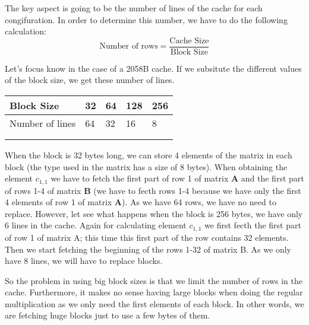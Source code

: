 \documentclass{article}
\begin{document}
The key aspect is going to be the number of lines of the cache for each congifuration. In order to determine this number, we have to do the following calculation: 
\[
\text{Number of rows} = \frac{\text{Cache Size}}{\text{Block Size}}
\]

Let's focus know in the case of a 2058B cache. If we subsitute the different values of the block size, we get these number of lines.

{
\begin{table}[h]
    \centering
    \begin{tabular}{lllll}
    \hline
    \multicolumn{1}{|l|}{Block Size}      & \multicolumn{1}{l|}{32} & \multicolumn{1}{l|}{64} & \multicolumn{1}{l|}{128} & \multicolumn{1}{l|}{256} \\ \hline
    \multicolumn{1}{|l|}{Number of lines} & \multicolumn{1}{l|}{64} & \multicolumn{1}{l|}{32} & \multicolumn{1}{l|}{16}  & \multicolumn{1}{l|}{8}   \\ \hline
                                          &                         &                         &                          &                          \\
                                          &                         &                         &                          &                         
    \end{tabular}
\end{table}
}



When the block is 32 bytes long, we can store 4 elements of the matrix in each block (the type used in the matrix has a size of 8 bytes). When obtaining the element $c_{1,1}$ we have to fetch the first part of row 1 of matrix $\mathbf{A}$ and the first part of rows 1-4 of matrix $\mathbf{B}$ (we have to fecth rows 1-4 because we have only the first 4 elements of row 1 of matrix $\mathbf{A}$). As we have 64 rows, we have no need to replace. However, let see what happens when the block is 256 bytes, we have only 6 lines in the cache. Again for calculating element $c_{1,1}$ we first fecth the first part of row 1 of matrix A; this time this first part of the row contains 32 elements. Then we start fetching the beginning of the rows 1-32 of matrix B. As we only have 8 lines, we will have to replace blocks. 

So the problem in using big block sizes is that we limit the number of rows in the cache. Furthermore, it makes no sense having large blocks when doing the regular multiplication as we only need the first elements of each block. In other words, we are fetching huge blocks just to use a few bytes of them.
\end{document}
